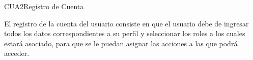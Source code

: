 \begin{UseCase}{CUA2}{Registro de Cuenta}
    {

    	
    	El registro de la cuenta del usuario consiste en que el usuario debe de ingresar todos los datos correspondientes a su perfil y seleccionar los roles a los cuales estará asociado, para que se le puedan asignar las acciones a las que podrá acceder.
    
    	
    }


\end{UseCase}
